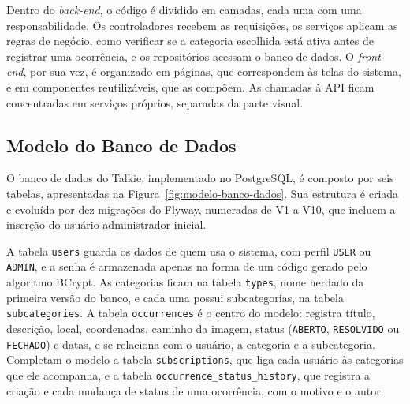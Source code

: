 \documentclass[12pt,a4paper]{article}
\begin{document}

Dentro do \textit{back-end}, o código é dividido em camadas, cada uma com uma responsabilidade. Os controladores recebem as requisições, os serviços aplicam as regras de negócio, como verificar se a categoria escolhida está ativa antes de registrar uma ocorrência, e os repositórios acessam o banco de dados. O \textit{front-end}, por sua vez, é organizado em páginas, que correspondem às telas do sistema, e em componentes reutilizáveis, que as compõem. As chamadas à API ficam concentradas em serviços próprios, separadas da parte visual.

\subsection{Modelo do Banco de Dados}
O banco de dados do Talkie, implementado no PostgreSQL, é composto por seis tabelas, apresentadas na Figura~\ref{fig:modelo-banco-dados}. Sua estrutura é criada e evoluída por dez migrações do Flyway, numeradas de V1 a V10, que incluem a inserção do usuário administrador inicial.


A tabela \texttt{users} guarda os dados de quem usa o sistema, com perfil \texttt{USER} ou \texttt{ADMIN}, e a senha é armazenada apenas na forma de um código gerado pelo algoritmo BCrypt. As categorias ficam na tabela \texttt{types}, nome herdado da primeira versão do banco, e cada uma possui subcategorias, na tabela \texttt{subcategories}. A tabela \texttt{occurrences} é o centro do modelo: registra título, descrição, local, coordenadas, caminho da imagem, status (\texttt{ABERTO}, \texttt{RESOLVIDO} ou \texttt{FECHADO}) e datas, e se relaciona com o usuário, a categoria e a subcategoria. Completam o modelo a tabela \texttt{subscriptions}, que liga cada usuário às categorias que ele acompanha, e a tabela \texttt{occurrence\_status\_history}, que registra a criação e cada mudança de status de uma ocorrência, com o motivo e o autor.
\end{document}
